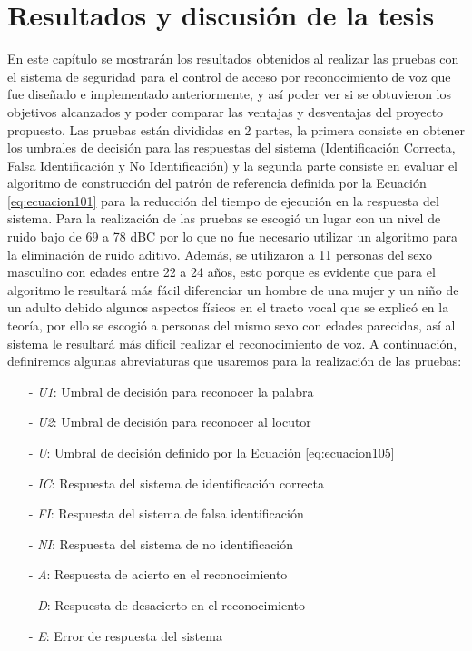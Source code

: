 \chapter{Resultados y discusión de la tesis}
En este capítulo se mostrarán los resultados obtenidos al realizar las pruebas con el sistema de seguridad para el control de acceso por reconocimiento de voz que fue diseñado e implementado anteriormente, y así poder ver si se obtuvieron los objetivos alcanzados y poder comparar las ventajas y desventajas del proyecto propuesto.
\vskip 0.5cm
Las pruebas están divididas en 2 partes, la primera consiste en obtener los umbrales de decisión para las respuestas del sistema (Identificación Correcta, Falsa Identificación y No Identificación) y la segunda parte consiste en evaluar el algoritmo de construcción del patrón de referencia definida por la Ecuación \eqref{eq:ecuacion101} para la reducción del tiempo de ejecución en la respuesta del sistema.
\vskip 0.5cm
Para la realización de las pruebas se escogió un lugar con un nivel de ruido bajo de 69 a 78 dBC por lo que no fue necesario utilizar un algoritmo para la eliminación de ruido aditivo. Además, se utilizaron a 11 personas del sexo masculino con edades entre 22 a 24 años, esto porque es evidente que para el algoritmo le resultará más fácil diferenciar un hombre de una mujer y un niño de un adulto debido algunos aspectos físicos en el tracto vocal que se explicó en la teoría, por ello se escogió a personas del mismo sexo con edades parecidas, así al sistema le resultará más difícil realizar el reconocimiento de voz. A continuación, definiremos algunas abreviaturas que usaremos para la realización de las pruebas:
\begin{enumerate}
\item[-]\textit{U1}: Umbral de decisión para reconocer la palabra
\item[-]\textit{U2}: Umbral de decisión para reconocer al locutor
\item[-]\textit{U}: Umbral de decisión definido por la Ecuación \eqref{eq:ecuacion105}
\item[-]\textit{IC}: Respuesta del sistema de identificación correcta
\item[-]\textit{FI}: Respuesta del sistema de falsa identificación
\item[-]\textit{NI}: Respuesta del sistema de no identificación
\item[-]\textit{A}: Respuesta de acierto en el reconocimiento
\item[-]\textit{D}: Respuesta de desacierto en el reconocimiento
\item[-]\textit{E}: Error de respuesta del sistema
\end{enumerate}
